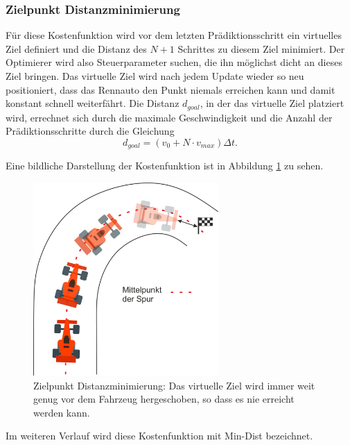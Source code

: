\documentclass{like}
\begin{document}
\subsubsection*{Zielpunkt Distanzminimierung}
Für diese Kostenfunktion wird vor dem letzten Prädiktionsschritt ein virtuelles Ziel definiert und die Distanz des $N+1$ Schrittes zu diesem Ziel minimiert. Der Optimierer wird also Steuerparameter suchen, die ihn möglichst dicht an dieses Ziel bringen. Das virtuelle Ziel wird nach jedem Update wieder so neu positioniert, dass das Rennauto den Punkt niemals erreichen kann und damit konstant schnell weiterfährt. Die Distanz $d_{goal}$, in der das virtuelle Ziel platziert wird, errechnet sich durch die maximale Geschwindigkeit und die Anzahl der Prädiktionsschritte durch die Gleichung 
\begin{equation}
d_{goal} = \left(v_0 + N \cdot v_{max} \right) \Delta t.
\end{equation}


Eine bildliche Darstellung der Kostenfunktion ist in Abbildung \ref{fig:costGoalDist} zu sehen. 

\begin{figure}[ht!]
	\centering
	\includegraphics[width=200pt]{Abbildungen/costGoalDist.png}
	\caption{Zielpunkt Distanzminimierung: Das virtuelle Ziel wird immer weit genug vor dem Fahrzeug hergeschoben, so dass es nie erreicht werden kann.}
	\label{fig:costGoalDist}
\end{figure}
Im weiteren Verlauf wird diese Kostenfunktion mit Min-Dist bezeichnet.
\end{document}
